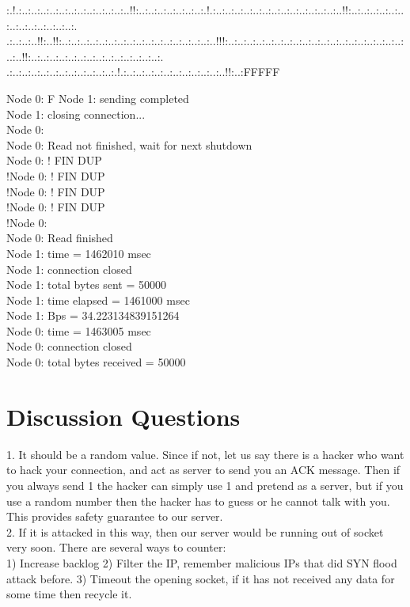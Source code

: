 \documentclass[paper=a4, fontsize=11pt]{scrartcl} %
\numberwithin{equation}{section} %
\numberwithin{figure}{section} %
\numberwithin{table}{section} %
\begin{document}
:.!.:..:..:..:..:..:..:..:..:..:..:..:..!!:..:..:..:..:..:..:..:.!.:..:..:..:..:..:..:..:..:..:..:..:..:..:..!!:..:..:..:..:..:..:..:..:..:..:..:..:..:.\\.:..:..:..!!:..!!:..:..:..:..:..:..:..:..:..:..:..:..:..:..:..:..:..!!!:..:..:..:..:..:..:..:..:..:..:..:..:..:..:..:..:..:..:..:..:..!!:..:..:..:..:..:..:..:..:..:..:..:..:..:..:.\\.:..:..:..:..:..:..:..:..:..:..:..:.!.:..:..:..:..:..:..:..:..:..:..:..!!:..:FFFFF

Node 0: F
Node 1: sending completed\\
Node 1: closing connection...\\
Node 0: \\
Node 0: Read not finished, wait for next shutdown\\
Node 0: ! FIN DUP\\
!Node 0: ! FIN DUP\\
!Node 0: ! FIN DUP\\
!Node 0: ! FIN DUP\\
!Node 0: \\
Node 0: Read finished\\
Node 1: time = 1462010 msec\\
Node 1: connection closed\\
Node 1: total bytes sent = 50000\\
Node 1: time elapsed = 1461000 msec\\
Node 1: Bps = 34.223134839151264\\
Node 0: time = 1463005 msec\\
Node 0: connection closed\\
Node 0: total bytes received = 50000

\section{Discussion Questions}
1. It should be a random value. Since if not, let us say there is a hacker who want to hack your connection, and act as server to send you an ACK message. Then if you always send 1 the hacker can simply use 1 and pretend as a server, but if you use a random number then the hacker has to guess or he cannot talk with you. This provides safety guarantee to our server.\\

2. If it is attacked in this way, then our server would be running out of socket very soon. There are several ways to counter:\\
1) Increase backlog
2) Filter the IP, remember malicious IPs that did SYN flood attack before.
3) Timeout the opening socket, if it has not received any data for some time then recycle it.\\
\end{document}

